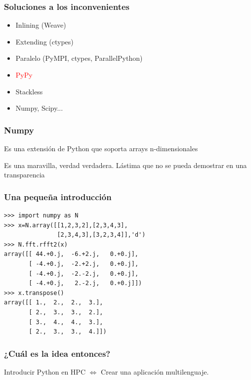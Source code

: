 \documentclass{beamer}
\begin{document}
\begin{frame}
 \frametitle{Soluciones a los inconvenientes}
\begin{itemize}
 \item Inlining (Weave)
 \item Extending (ctypes)
 \item Paralelo (PyMPI, ctypes, ParallelPython)
 \item \textcolor{red}{PyPy}
 \item Stackless
 \item Numpy, Scipy...
\end{itemize}
\end{frame}

\begin{frame}
 \frametitle{Numpy}
Es una extensión de Python que soporta arrays n-dimensionales\\
\vspace{2cm}
\begin{large}
Es una maravilla, verdad verdadera. Lástima que no se pueda demostrar en una transparencia 
\end{large}
\end{frame}

\begin{frame}[containsverbatim]
 \frametitle{Una pequeña introducción}
\begin{verbatim}
>>> import numpy as N
>>> x=N.array([[1,2,3,2],[2,3,4,3],
               [2,3,4,3],[3,2,3,4]],'d')
>>> N.fft.rfft2(x)
array([[ 44.+0.j,  -6.+2.j,   0.+0.j],
       [ -4.+0.j,  -2.+2.j,   0.+0.j],
       [ -4.+0.j,  -2.-2.j,   0.+0.j],
       [ -4.+0.j,   2.-2.j,   0.+0.j]])
>>> x.transpose()
array([[ 1.,  2.,  2.,  3.],
       [ 2.,  3.,  3.,  2.],
       [ 3.,  4.,  4.,  3.],
       [ 2.,  3.,  3.,  4.]])
\end{verbatim}
\end{frame}

\begin{frame}
 \frametitle{¿Cuál es la idea entonces?}
Introducir Python en HPC $\Leftrightarrow$ Crear una aplicación multilenguaje.

\begin{center}

\end{center}

\end{frame}
\end{document}
